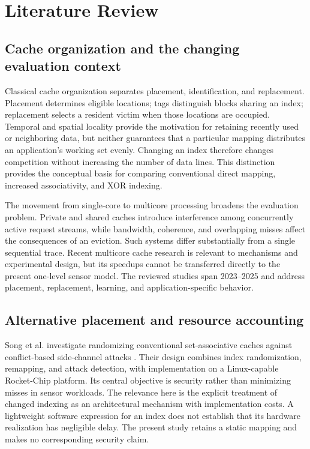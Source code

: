 \documentclass[11pt,a4paper]{article}
\begin{document}
\section{Literature Review}
\subsection{Cache organization and the changing evaluation context}
Classical cache organization separates placement, identification, and replacement. Placement determines eligible locations; tags distinguish blocks sharing an index; replacement selects a resident victim when those locations are occupied. Temporal and spatial locality provide the motivation for retaining recently used or neighboring data, but neither guarantees that a particular mapping distributes an application's working set evenly. Changing an index therefore changes competition without increasing the number of data lines. This distinction provides the conceptual basis for comparing conventional direct mapping, increased associativity, and XOR indexing.

The movement from single-core to multicore processing broadens the evaluation problem. Private and shared caches introduce interference among concurrently active request streams, while bandwidth, coherence, and overlapping misses affect the consequences of an eviction. Such systems differ substantially from a single sequential trace. Recent multicore cache research is relevant to mechanisms and experimental design, but its speedups cannot be transferred directly to the present one-level sensor model. The reviewed studies span 2023--2025 and address placement, replacement, learning, and application-specific behavior.

\subsection{Alternative placement and resource accounting}
Song et al. investigate randomizing conventional set-associative caches against conflict-based side-channel attacks \cite{song2024}. Their design combines index randomization, remapping, and attack detection, with implementation on a Linux-capable Rocket-Chip platform. Its central objective is security rather than minimizing misses in sensor workloads. The relevance here is the explicit treatment of changed indexing as an architectural mechanism with implementation costs. A lightweight software expression for an index does not establish that its hardware realization has negligible delay. The present study retains a static mapping and makes no corresponding security claim.
\end{document}
